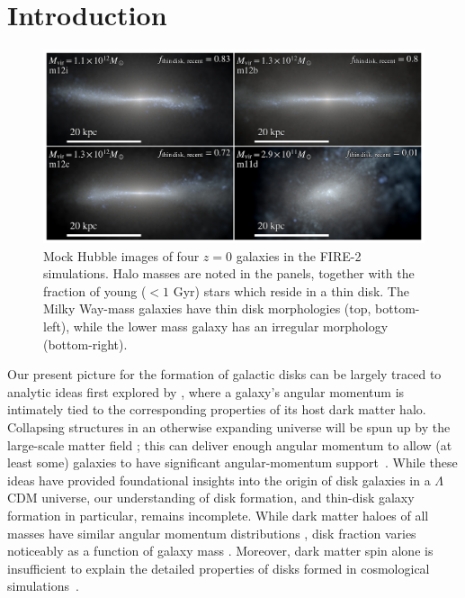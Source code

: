 \documentclass[fleqn,usenatbib]{mnras}
\begin{document}


\section{Introduction}
\label{s: introduction}

\begin{figure}
    \centering
    \includegraphics[width=\textwidth]{figures/stars.pdf}
    \caption{
    Mock Hubble images of four $z=0$ galaxies in the FIRE-2 simulations. Halo masses are noted in the panels, together with the fraction of young ($<1$ Gyr) stars which reside in a thin disk.  The Milky Way-mass galaxies have thin disk morphologies (top, bottom-left), while the lower mass galaxy has an irregular morphology (bottom-right).
    }
    \label{f: stars}
\end{figure}

Our present picture for the formation of galactic disks can be largely traced to analytic ideas first explored by \citet{fall1980}, where a galaxy's angular momentum is intimately tied to the corresponding properties of its host dark matter halo.
Collapsing structures in an otherwise expanding universe will be spun up by the large-scale matter field \citep{Peebles69};
this can deliver enough angular momentum to allow (at least some) galaxies to have significant angular-momentum support~\citep[e.g.][]{MMW98}. 
While these ideas have provided foundational insights into the origin of disk galaxies in a $\Lambda$CDM universe, our understanding of disk  formation, and thin-disk galaxy formation in particular, remains incomplete. 
While dark matter haloes of all masses have similar angular momentum distributions \citep[e.g.][]{Barnes87}, disk fraction varies noticeably as a function of galaxy mass \citep[e.g.][]{Bernardi2010, Bluck2014, Moffett16}.
Moreover, dark matter spin alone is insufficient to explain the detailed properties of disks formed in cosmological simulations~\citep[e.g.][]{Sales2012, GK18}.  
\end{document}

